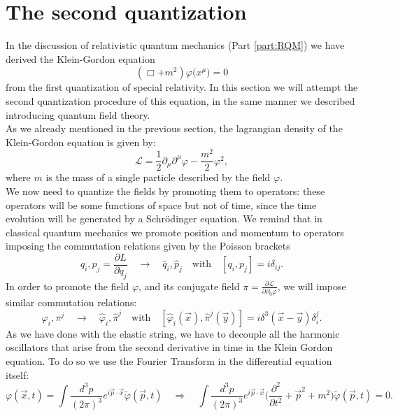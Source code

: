 \section{The second quantization}
In the discussion of relativistic quantum mechanics (Part \ref{part:RQM}) we have derived the Klein-Gordon equation
\begin{equation*}
    (\Box +m^2)\varphi\big(x^\mu\big)=0
\end{equation*}
from the first quantization of special relativity. In this section we will attempt the second quantization procedure of this equation, in the same manner we described introducing quantum field theory.\\

As we already mentioned in the previous section, the lagrangian density of the Klein-Gordon equation is given by:
\begin{equation}\label{KGLagrDensity}
    \mathcal{L}=\frac{1}{2}\partial_\mu\partial^\mu\varphi-\frac{m^2}{2}\varphi^2,
\end{equation}
where $m$ is the mass of a single particle described by the field $\varphi$.\\
We now need to quantize the fields by promoting them to operators: these operators will be some functions of space but not of time, since the time evolution will be generated by a Schrödinger equation.
We remind that in classical quantum mechanics we promote position and momentum to operators imposing the commutation relations given by the Poisson brackets
\begin{equation*}
    q_i,p_j=\frac{\partial L}{\partial \dot q_j}\quad\longrightarrow\quad \hat{q}_i, \hat{p}_j\quad \text{with}\quad [q_i,p_j]=i\delta_{ij}.
\end{equation*}
In order to promote the field $\varphi$, and its conjugate field $\pi=\frac{\partial\mathcal{L} }{\partial\partial_0\varphi}$, we will impose similar commutation relations:
\begin{equation*}
    \varphi_i,\pi^j\quad\longrightarrow\quad \hat{\varphi}_i, \hat{\pi}^j\quad \text{with}\quad [\hat{\varphi}_i(\vec x), \hat{\pi}^j(\vec y)]=i\delta^3(\vec x-\vec y)\delta_{i}^j.
\end{equation*}
As we have done with the elastic string, we have to decouple all the harmonic oscillators that arise from the second derivative in time in the Klein Gordon equation. To do so we use the Fourier Transform in the differential equation itself:
\begin{equation*}
    \varphi(\vec x,t)=\int \frac{d^3p}{(2\pi)^3}e^{i\vec p\cdot \vec x} \tilde\varphi(\vec p,t) \quad \Rightarrow\quad \int \frac{d^3p}{(2\pi)^3}e^{i\vec p\cdot \vec x}\bigg(\frac{\partial^2}{\partial t^2}+\vec p^2+m^2\bigg)\tilde\varphi(\vec p,t)=0.
\end{equation*}

